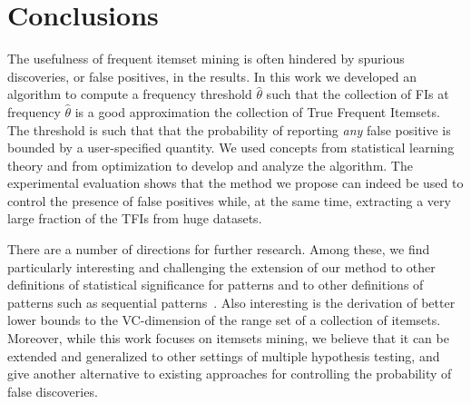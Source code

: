 \section{Conclusions}\label{sec:concl}
The usefulness of frequent itemset mining is often hindered by spurious
discoveries, or false positives, in the results. In this work we developed an
algorithm to compute a frequency threshold $\hat\theta$ such that the collection
of FIs at frequency $\hat\theta$ is a good approximation the collection of True
Frequent Itemsets. The threshold is such that that the probability of reporting
\emph{any} false positive is bounded by a user-specified quantity. We used
concepts from statistical learning theory and from optimization to develop and
analyze the algorithm. The experimental evaluation shows that the method we
propose can indeed be used to control the presence of false positives while, at
the same time, extracting a very large fraction of the TFIs from huge datasets.

There are a number of directions for further research. Among these, we find
particularly interesting and challenging the extension of our method to other
definitions of statistical significance for patterns and to other definitions of
patterns such as sequential patterns~\citep{LowCamRKP13}. Also interesting is
the derivation of better lower bounds to the VC-dimension of the range set of a
collection of itemsets. Moreover, while this work focuses on itemsets mining, we
believe that it can be extended and generalized to other settings of multiple
hypothesis testing, and give another alternative to existing approaches for
controlling the probability of false discoveries.

